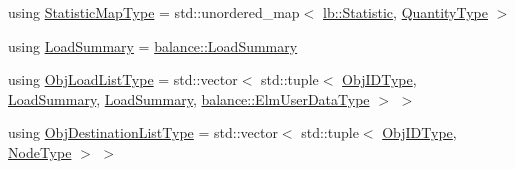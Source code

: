 \begin{DoxyCompactItemize}
\item 
using \hyperlink{structvt_1_1vrt_1_1collection_1_1lb_1_1_base_l_b_acd9bdad961ac83c96b7a227de672f96c}{Statistic\+Map\+Type} = std\+::unordered\+\_\+map$<$ \hyperlink{namespacevt_1_1vrt_1_1collection_1_1lb_af0e20ef9afee77295053aa83bf1348b1}{lb\+::\+Statistic}, \hyperlink{structvt_1_1vrt_1_1collection_1_1lb_1_1_base_l_b_a864b2c437d81680577013741e265ef0d}{Quantity\+Type} $>$
\item 
using \hyperlink{structvt_1_1vrt_1_1collection_1_1lb_1_1_base_l_b_aa78583f362acc50fcca87d4ce3150151}{Load\+Summary} = \hyperlink{structvt_1_1vrt_1_1collection_1_1balance_1_1_load_summary}{balance\+::\+Load\+Summary}
\item 
using \hyperlink{structvt_1_1vrt_1_1collection_1_1lb_1_1_base_l_b_ae16d5f0fe9078684bc8e4a4b86ce3a0c}{Obj\+Load\+List\+Type} = std\+::vector$<$ std\+::tuple$<$ \hyperlink{structvt_1_1vrt_1_1collection_1_1lb_1_1_base_l_b_a790b22acf448880599724749cdc4e9b3}{Obj\+I\+D\+Type}, \hyperlink{structvt_1_1vrt_1_1collection_1_1lb_1_1_base_l_b_aa78583f362acc50fcca87d4ce3150151}{Load\+Summary}, \hyperlink{structvt_1_1vrt_1_1collection_1_1lb_1_1_base_l_b_aa78583f362acc50fcca87d4ce3150151}{Load\+Summary}, \hyperlink{namespacevt_1_1vrt_1_1collection_1_1balance_abf9eea0f4c24e41036ab844025e7d4c8}{balance\+::\+Elm\+User\+Data\+Type} $>$ $>$
\item 
using \hyperlink{structvt_1_1vrt_1_1collection_1_1lb_1_1_base_l_b_ad50ba1022c6beeb6e9187a8f1a3e16fe}{Obj\+Destination\+List\+Type} = std\+::vector$<$ std\+::tuple$<$ \hyperlink{structvt_1_1vrt_1_1collection_1_1lb_1_1_base_l_b_a790b22acf448880599724749cdc4e9b3}{Obj\+I\+D\+Type}, \hyperlink{namespacevt_a866da9d0efc19c0a1ce79e9e492f47e2}{Node\+Type} $>$ $>$
\end{DoxyCompactItemize}
